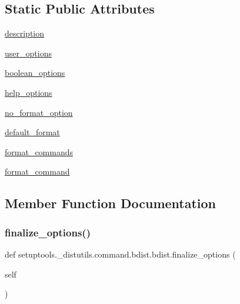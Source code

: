 \subsection*{Static Public Attributes}
\begin{DoxyCompactItemize}
\item 
\hyperlink{classsetuptools_1_1__distutils_1_1command_1_1bdist_1_1bdist_a4aaf25c929d26f113f780bf141816a57}{description}
\item 
\hyperlink{classsetuptools_1_1__distutils_1_1command_1_1bdist_1_1bdist_a324ef42e24cc19bf1c89acd0e748309a}{user\+\_\+options}
\item 
\hyperlink{classsetuptools_1_1__distutils_1_1command_1_1bdist_1_1bdist_ab76bef356aff36b175f93bddbce2d7aa}{boolean\+\_\+options}
\item 
\hyperlink{classsetuptools_1_1__distutils_1_1command_1_1bdist_1_1bdist_abef4ae945bab8cd5109a7232143ac481}{help\+\_\+options}
\item 
\hyperlink{classsetuptools_1_1__distutils_1_1command_1_1bdist_1_1bdist_aca773c372ea23b471dda8d5a8ee7c2c4}{no\+\_\+format\+\_\+option}
\item 
\hyperlink{classsetuptools_1_1__distutils_1_1command_1_1bdist_1_1bdist_ae31f7650d34bf2c03cdbb562ec584084}{default\+\_\+format}
\item 
\hyperlink{classsetuptools_1_1__distutils_1_1command_1_1bdist_1_1bdist_ac68056bb5acef2217aa30ca1615770f3}{format\+\_\+commands}
\item 
\hyperlink{classsetuptools_1_1__distutils_1_1command_1_1bdist_1_1bdist_a5e27792df01d23ead736cdac8666cefd}{format\+\_\+command}
\end{DoxyCompactItemize}


\subsection{Member Function Documentation}
\mbox{\label{classsetuptools_1_1__distutils_1_1command_1_1bdist_1_1bdist_af1c3c83bcaf2beffe2e4a29c5f4427a9}} 
\subsubsection{\texorpdfstring{finalize\+\_\+options()}{finalize\_options()}}
{\footnotesize\ttfamily def setuptools.\+\_\+distutils.\+command.\+bdist.\+bdist.\+finalize\+\_\+options (\begin{DoxyParamCaption}\item[{}]{self }\end{DoxyParamCaption})}

